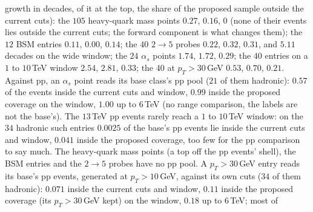 \documentclass[11pt]{article}
\begin{document}
\begin{itemize}
    growth in decades, of it at the top, the share of the proposed sample outside the current cuts): the $105$
    heavy-quark mass points $0.27$, $0.16$, $0$ (none of their events lies outside the current cuts; the forward
    component is what changes them); the $12$ BSM entries $0.11$, $0.00$, $0.14$; the $40$ $2\to5$ probes $0.22$,
    $0.32$, $0.31$, and $5.11$ decades on the wide window; the $24$ $\alpha_s$ points $1.74$, $1.72$, $0.29$; the $40$
    entries on a $1$ to $10$\,TeV window $2.54$, $2.81$, $0.33$; the $40$ at $p_T>30$\,GeV $0.53$, $0.70$, $0.21$.
    Against pp, an $\alpha_s$ point reads its base class's pp pool ($21$ of them hadronic): $0.57$ of the events inside
    the current cuts and window, $0.99$ inside the proposed coverage on the window, $1.00$ up to $6$\,TeV (no range
    comparison, the labels are not the base's). The $13$\,TeV pp events rarely reach a $1$ to $10$\,TeV window: on the
    $34$ hadronic such entries $0.0025$ of the base's pp events lie inside the current cuts and window, $0.041$ inside
    the proposed coverage, too few for the pp comparison to say much. The heavy-quark mass points (a top off the pp
    events' shell), the BSM entries and the $2\to5$ probes have no pp pool. A $p_T>30$\,GeV entry reads its base's pp
    events, generated at $p_T>10$\,GeV, against its own cuts ($34$ of them hadronic): $0.071$ inside the current cuts and
    window, $0.11$ inside the proposed coverage (its $p_T>30$\,GeV kept) on the window, $0.18$ up to $6$\,TeV; most of

\end{itemize}
\end{document}
